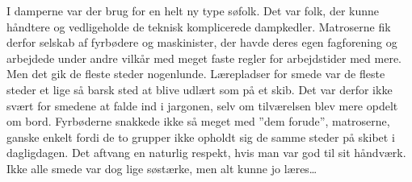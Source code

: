 I damperne var der brug
for en helt ny type søfolk. Det var folk, der kunne håndtere og
vedligeholde de teknisk komplicerede dampkedler. Matroserne fik derfor
selskab af fyrbødere og maskinister, der havde deres egen fagforening og
arbejdede under andre vilkår med meget faste regler for arbejdstider med
mere. Men det gik de fleste steder nogenlunde. Lærepladser for smede var
de fleste steder et lige så barsk sted at blive udlært som på et skib.
Det var derfor ikke svært for smedene at falde ind i jargonen, selv om
tilværelsen blev mere opdelt om bord. Fyrbøderne snakkede ikke så meget
med ''dem forude'', matroserne, ganske enkelt fordi de to grupper ikke
opholdt sig de samme steder på skibet i dagligdagen. Det aftvang en
naturlig respekt, hvis man var god til sit håndværk. Ikke alle smede var
dog lige søstærke, men alt kunne jo læres\ldots{} 

